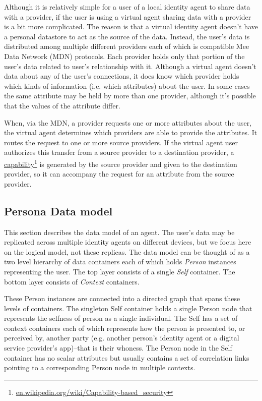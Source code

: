 \documentclass[11pt, oneside]{article}   	%
\newcommand{\hyperfootnote}[1][]{\def\ArgI{{#1}}\hyperfootnoteRelay}
\newcommand\hyperfootnoteRelay[2][]{\href{#1#2}{\ArgI}\footnote{\href{#1#2}{#2}}}
\begin{document}
Although it is relatively simple for a user of a local identity agent to share data with a provider, if the user is using a virtual agent sharing data with a provider is a bit more complicated. The reason is that a virtual identity agent doesn't have a personal datastore to act as the source of the data. Instead, the user's data is distributed among multiple different providers each of which is compatible Mee Data Network (MDN) protocols. Each provider holds only that portion of the user's data related to user's relationship with it. Although a virtual agent doesn't data about any of the user's connections, it does know which provider holds which kinds of information (i.e. which attributes) about the user. In some cases the same attribute may be held by more than one provider, although it's possible that the values of the attribute differ.

When, via the MDN, a provider requests one or more attributes about the user, the virtual agent determines which providers are able to provide the attributes. It routes the request to one or more source providers. If the virtual agent user authorizes this transfer from a source provider to a destination provider, a \hyperfootnote[capability][https://]{en.wikipedia.org/wiki/Capability-based\_security} is generated by the source provider and given to the destination provider, so it can accompany the request for an attribute from the source provider. 

\subsection{Persona Data model}\label{data_model_subsection} 

This section describes the data model of an agent. The user's data may be replicated across multiple identity agents on different devices, but we focus here on the logical model, not these replicas. The data model can be thought of as a two level hierarchy of data containers each of which holds \emph{Person} instances representing the user. The top layer consists of a single \emph{Self} container. The bottom layer consists of \emph{Context} containers.

These Person instances are connected into a directed graph that spans these  levels of containers. The singleton Self container holds a single Person node that represents the selfness of person as a single individual. The Self has a set of context containers each of which represents how the person is presented to, or perceived by, another party (e.g. another person's identity agent or a digital service provider's app)--that is their whoness. The Person node in the Self container has no scalar attributes but usually contains a set of correlation links pointing to a corresponding Person node in multiple contexts.
\end{document}
